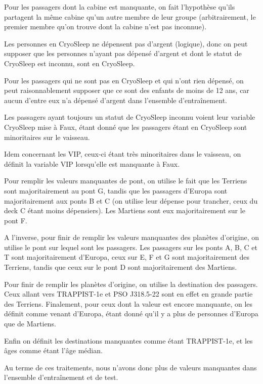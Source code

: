 \documentclass[a4paper]{article}
\begin{document}
    Pour les passagers dont la cabine est manquante, on fait l'hypothèse qu'ils partagent la même cabine qu'un autre
    membre de leur groupe (arbitrairement, le premier membre qu'on trouve dont la cabine n'est pas inconnue).

    Les personnes en CryoSleep ne dépensent pas d'argent (logique), donc on peut supposer que les personnes
    n'ayant pas dépensé d'argent et dont le statut de CryoSleep est inconnu, sont en CryoSleep.

    Pour les passagers qui ne sont pas en CryoSleep et qui n'ont rien dépensé, on peut raisonnablement supposer que ce sont des enfants
    de moins de 12 ans, car aucun d'entre eux n'a dépensé d'argent dans l'ensemble d'entraînement.

    Les passagers ayant toujours un statut de CryoSleep inconnu voient leur variable CryoSleep mise à Faux,
    étant donné que les passagers étant en CryoSleep sont minoritaires sur le vaisseau.

    Idem concernant les VIP, ceux-ci étant très minoritaires dans le vaisseau, on définit la variable VIP lorsqu'elle est manquante à Faux.

    Pour remplir les valeurs manquantes de pont, on utilise le fait que les Terriens sont majoritairement au pont G,
    tandis que les passagers d'Europa sont majoritairement aux ponts B et C (on utilise leur dépense pour trancher, ceux du deck C étant moins dépensiers).
    Les Martiens sont eux majoritairement sur le pont F.

    A l'inverse, pour finir de remplir les valeurs manquantes des planètes d'origine, on utilise le pont sur lequel sont les passagers.
    Les passagers sur les ponts A, B, C et T sont majoritairement d'Europa, ceux sur E, F et G sont majoritairement des Terriens, tandis que
    ceux sur le pont D sont majoritairement des Martiens.

    Pour finir de remplir les planètes d'origine, on utilise la destination des passagers.
    Ceux allant vers TRAPPIST-1e et PSO J318.5-22 sont en effet en grande partie des Terriens.
    Finalement, pour ceux dont la valeur est encore manquante, on les définit comme venant d'Europa,
    étant donné qu'il y a plus de personnes d'Europa que de Martiens.

    Enfin on définit les destinations manquantes comme étant TRAPPIST-1e, et les âges comme étant l'âge médian.

    Au terme de ces traitements, nous n'avons donc plus de valeurs manquantes dans l'ensemble d'entraînement et de test.
\end{document}
